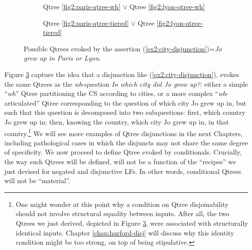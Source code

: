 \begin{figure}[H]
	\centering
	\begin{subfigure}[t]{.45\linewidth}
		\centering
		\caption{Qtree \ref{fig2:paris-qtree-wh} $\vee$ Qtree \ref{fig2:lyon-qtree-wh}}\label{fig2:paris-or-lyon-qtree-wh}
	\end{subfigure}
	\hfill
	\begin{subfigure}[t]{.45\linewidth}
		\centering{}
		\caption{Qtree \ref{fig2:paris-qtree-tiered} $\vee$ Qtree \ref{fig2:lyon-qtree-tiered}}\label{fig2:paris-or-lyon-qtree-tiered}
	\end{subfigure}
	\caption{Possible Qtrees evoked by the assertion (\ref{ex2:city-disjunction})=\textit{Jo grew up in Paris or Lyon}.}\label{fig2:paris-or-lyon-qtrees}
\end{figure}

Figure \ref{fig2:paris-or-lyon-qtrees} capture the idea that a disjunction like (\ref{ex2:city-disjunction}), evokes the same Qtrees as the \textit{wh}-question \textit{In which city did Jo grow up?}: either a simple ``\textit{wh}'' Qtree partitioning the CS according to cities, or a more complex ``\textit{wh}-articulated'' Qtree corresponding to the question of which city Jo grew up in, but such that this question is decomposed into two subquestions: first, which country Jo grew up in; then, knowing the country, which city Jo grew up in, in that country.\footnote{One might wonder at this point why a condition on Qtree disjoinability should not involve structural equality between inputs. After all, the two Qtrees we just derived, depicted in Figure \ref{fig2:paris-or-lyon-qtrees}, were associated with structurally identical inputs. Chapter \ref{chap:hurford-disj} will discuss why this identity condition might be too strong, on top of being stipulative.} We will see more examples of Qtree disjunctions in the next Chapters, including pathological cases in which the disjuncts may not share the same degree of specificity. We now proceed to define Qtree evoked by conditionals. Crucially, the way such Qtrees will be defined, will not be a function of the ``recipes'' we just devised for negated and disjunctive LFs. In other words, conditional Qtrees will not be ``material''.


